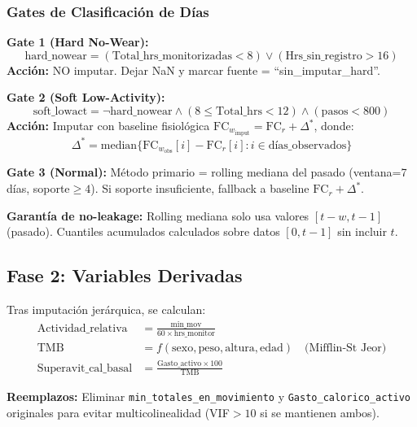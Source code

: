\documentclass[12pt,a4paper,twoside]{article}
\newcommand{\TMB}{\mathrm{TMB}}
\newcommand{\FCr}{\mathrm{FC}_r}
\newcommand{\FCw}{\mathrm{FC}_w}
\begin{document}
\subsubsection{Gates de Clasificación de Días}

\textbf{Gate 1 (Hard No-Wear):}
\begin{equation}
\text{hard\_nowear} = (\text{Total\_hrs\_monitorizadas} < 8) \lor (\text{Hrs\_sin\_registro} > 16)
\end{equation}
\textbf{Acción:} NO imputar. Dejar NaN y marcar fuente = ``sin\_imputar\_hard''.

\textbf{Gate 2 (Soft Low-Activity):}
\begin{equation}
\text{soft\_lowact} = \neg\text{hard\_nowear} \land (8 \leq \text{Total\_hrs} < 12) \land (\text{pasos} < 800)
\end{equation}
\textbf{Acción:} Imputar con baseline fisiológica $\FCw_{\text{imput}} = \FCr + \Delta^*$, donde:
\begin{equation}
\Delta^* = \text{median}\{\FCw_{\text{obs}}[i] - \FCr[i] : i \in \text{días\_observados}\}
\end{equation}

\textbf{Gate 3 (Normal):} Método primario = rolling mediana del pasado (ventana=7 días, soporte$\geq 4$). Si soporte insuficiente, fallback a baseline $\FCr + \Delta^*$.

\begin{nota}
\textbf{Garantía de no-leakage:} Rolling mediana solo usa valores $[t-w, t-1]$ (pasado). Cuantiles acumulados calculados sobre datos $[0, t-1]$ sin incluir $t$.
\end{nota}

\subsection{Fase 2: Variables Derivadas}

Tras imputación jerárquica, se calculan:
\begin{align}
\text{Actividad\_relativa} &= \frac{\text{min\_mov}}{60 \times \text{hrs\_monitor}} \\
\TMB &= f(\text{sexo}, \text{peso}, \text{altura}, \text{edad}) \quad \text{(Mifflin-St Jeor)} \\
\text{Superavit\_cal\_basal} &= \frac{\text{Gasto\_activo} \times 100}{\TMB}
\end{align}

\textbf{Reemplazos:} Eliminar \texttt{min\_totales\_en\_movimiento} y \texttt{Gasto\_calorico\_activo} originales para evitar multicolinealidad (VIF$>10$ si se mantienen ambos).
\end{document}
